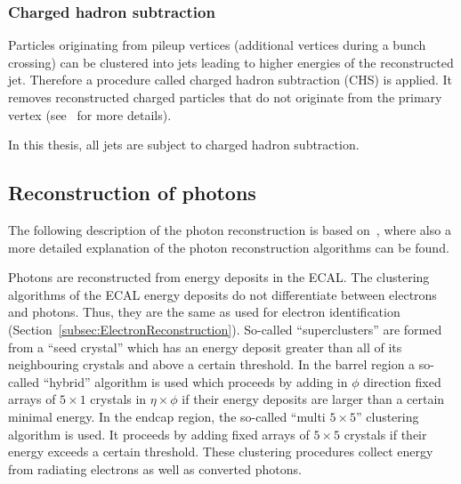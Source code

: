 \subsubsection*{Charged hadron subtraction}
Particles originating from pileup vertices (additional vertices during a bunch crossing) can be clustered into jets leading to higher energies of the reconstructed jet.
Therefore a procedure called charged hadron subtraction (CHS) is applied.
It removes reconstructed charged particles that do not originate from the primary vertex (see~\cite{bib:CHS_2012} for more details).

In this thesis, all jets are subject to charged hadron subtraction.

\subsection{Reconstruction of photons}
\label{subsec:PhotonReconstruction}
The following description of the photon reconstruction is based on~\cite{bib:CMS:PhotonIdentification_8TeV}, where also a more detailed explanation of the photon reconstruction algorithms can be found.

Photons are reconstructed from energy deposits in the ECAL.
The clustering algorithms of the ECAL energy deposits do not differentiate between electrons and photons.
Thus, they are the same as used for electron identification (Section~\ref{subsec:ElectronReconstruction}).
So-called ``superclusters'' are formed from a ``seed crystal'' which has an energy deposit greater than all of its neighbouring crystals and above a certain threshold.
In the barrel region a so-called ``hybrid'' algorithm is used which proceeds by adding in $\phi$ direction fixed arrays of $5 \times 1$ crystals in $\eta \times \phi$ if their energy deposits are larger than a certain minimal energy.
In the endcap region, the so-called ``multi $5 \times 5$'' clustering algorithm is used.
It proceeds by adding fixed arrays of $5 \times 5$ crystals if their energy exceeds a certain threshold.
These clustering procedures collect energy from radiating electrons as well as converted photons.

